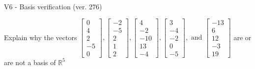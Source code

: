 \begin{exercise}
  \begin{exerciseTitle}V6 - Basis verification (ver. 276)\end{exerciseTitle}
  \begin{exerciseStatement}
    Explain why the vectors \(\left[\begin{array}{r}
0 \\
4 \\
2 \\
-5 \\
0
\end{array}\right] , \left[\begin{array}{r}
-2 \\
-5 \\
2 \\
1 \\
2
\end{array}\right] , \left[\begin{array}{r}
4 \\
-2 \\
-10 \\
13 \\
-4
\end{array}\right] , \left[\begin{array}{r}
3 \\
-4 \\
-2 \\
0 \\
-5
\end{array}\right] , \text{ and } \left[\begin{array}{r}
-13 \\
6 \\
12 \\
-3 \\
19
\end{array}\right]\) are or are not a basis of \(\mathbb{R}^5\)	



\end{exerciseStatement}
\end{exercise}
